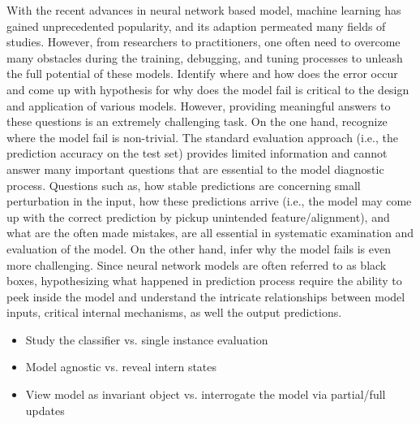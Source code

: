 \maketitle

With the recent advances in neural network based model, machine learning has
gained unprecedented popularity, and its adaption permeated many fields of studies.
%
However, from researchers to practitioners, one often need to overcome many
obstacles during the training, debugging, and tuning processes to unleash
the full potential of these models.
%
Identify where and how does the error occur and come up with hypothesis for
why does the model fail is critical to the design and application of various models.
However, providing meaningful answers to these questions is an extremely challenging task.
On the one hand, recognize where the model fail is non-trivial. The standard evaluation approach (i.e., the prediction accuracy on the test set) provides limited information and cannot answer many important questions that are essential to the model diagnostic process. Questions such as, how stable predictions are concerning small perturbation in the input, how these predictions arrive (i.e., the model may come up with the correct prediction by pickup unintended feature/alignment), and what are the often made mistakes, are all essential in systematic examination and evaluation of the model. On the other hand, infer why the model fails is even more challenging. Since neural network models are often referred to as black boxes, hypothesizing what happened in prediction process require the ability to peek inside the model and understand the intricate relationships between model inputs, critical internal mechanisms, as well the output predictions.

\begin{itemize}
    \item Study the classifier  vs. single instance evaluation
    \item Model agnostic vs. reveal intern states
    \item View model as invariant object vs. interrogate the model via partial/full updates
\end{itemize}

